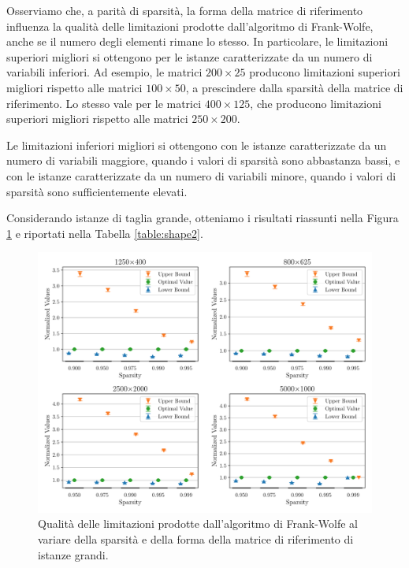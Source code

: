 Osserviamo che, a parità di sparsità, la forma della matrice di riferimento influenza la qualità delle limitazioni
prodotte dall'algoritmo di Frank-Wolfe, anche se il numero degli elementi rimane lo stesso. In particolare, le
limitazioni superiori migliori si ottengono per le istanze caratterizzate da un numero di variabili inferiori. Ad
esempio, le matrici \( 200\times 25 \) producono limitazioni superiori migliori rispetto alle matrici  \( 100\times 50
\), a prescindere dalla sparsità della matrice di riferimento. Lo stesso vale per le matrici \( 400\times 125 \), che
producono limitazioni superiori migliori rispetto alle matrici \( 250\times 200 \).

Le limitazioni inferiori migliori si ottengono con le istanze caratterizzate da un numero di variabili maggiore, quando
i valori di sparsità sono abbastanza bassi, e con le istanze caratterizzate da un numero di variabili minore, quando i
valori di sparsità sono sufficientemente elevati.

Considerando istanze di taglia grande, otteniamo i risultati riassunti nella Figura \ref{fig:shape2} e riportati nella
Tabella \ref{table:shape2}.

\begin{figure}[ht]
    \centering
    \includegraphics[width=\textwidth]{assets/figures/shape2.pdf}
    \caption{Qualità delle limitazioni prodotte dall’algoritmo di Frank-Wolfe al variare della sparsità e della forma
    della matrice di riferimento di istanze grandi.}
    \label{fig:shape2}
\end{figure}

